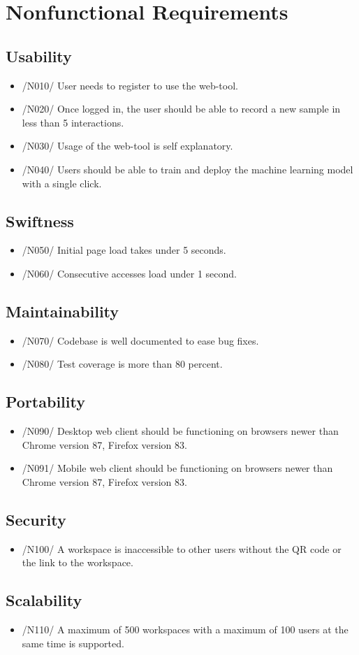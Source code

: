 \section{Nonfunctional Requirements}
\subsection{Usability}
\begin{itemize}
    \item /N010/ User needs to register to use the web-tool.
    \item /N020/ Once logged in, the user should be able to record a new sample in less than 5 interactions.
    \item /N030/ Usage of the web-tool is self explanatory.
    \item /N040/ Users should be able to train and deploy the \gls{machine learning model} with a single click.
\end{itemize}
\subsection{Swiftness}
\begin{itemize}
    \item /N050/ Initial page load takes under 5 seconds.
    \item /N060/ Consecutive accesses load under 1 second.
\end{itemize}
\subsection{Maintainability}
\begin{itemize}
    \item /N070/ Codebase is well documented to ease bug fixes.
    \item /N080/ Test coverage is more than 80 percent.
\end{itemize}
\subsection{Portability}
\begin{itemize}
    \item /N090/ Desktop web client should be functioning on browsers newer than Chrome version 87, Firefox version 83.
    \item /N091/ Mobile web client should be functioning on browsers newer than Chrome version 87, Firefox version 83.
\end{itemize}
\subsection{Security}
\begin{itemize}
    \item /N100/ A \gls{workspace} is inaccessible to other users without the \gls{QR code} or the link to the \gls{workspace}.
\end{itemize}
\subsection{Scalability}
\begin{itemize}
    \item /N110/ A maximum of 500 \glspl{workspace} with a maximum of 100 users at the same time is supported. 
\end{itemize}
